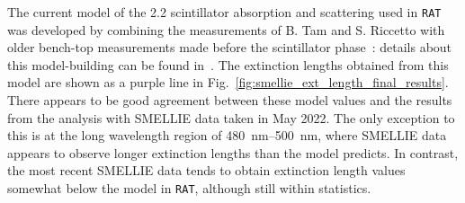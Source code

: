 The current model of the \SI{2.2}{\gpl} scintillator absorption and scattering used in \texttt{RAT} was developed by combining the measurements of B. Tam and S. Riccetto with older bench-top measurements made before the scintillator phase~\cite{}: details about this model-building can be found in~\cite{}. %
The extinction lengths obtained from this model are shown as a purple line in Fig.~\ref{fig:smellie_ext_length_final_results}. There appears to be good agreement between these model values and the results from the analysis with SMELLIE data taken in May 2022. The only exception to this is at the long wavelength region of \SIrange{480}{500}{\nm}, where SMELLIE data appears to observe longer extinction lengths than the model predicts. In contrast, the most recent SMELLIE data tends to obtain extinction length values somewhat below the model in \texttt{RAT}, although still within statistics.




